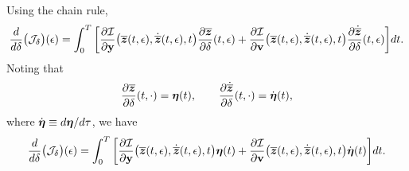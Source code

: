 \documentclass[3p,computermodern,10pt]{elsarticle}
\begin{document}
\begin{appendices}
Using the chain rule,
$$ 
\frac{d}{d\delta} \big( \mathcal{J}_{\delta} \big)(\epsilon)= 
\int_0^T \bigg[ \frac{\partial \mathcal{I}  }{\partial \mathbf{y} } \big(\overline{\boldsymbol z}(t,\epsilon),\dot{\overline{\boldsymbol z}}(t,\epsilon) ,t\big) \frac{\partial \overline{\boldsymbol z} }{\partial \delta}(t,\epsilon)  + \frac{\partial \mathcal{I}}{\partial \mathbf{{v}} } \big(\overline{\boldsymbol z}(t,\epsilon),\dot{\overline{\boldsymbol z}}(t,\epsilon) ,t \big) \frac{\partial \dot{\overline{\boldsymbol z}}}{\partial \delta} (t,\epsilon)\bigg]dt . $$
Noting that
$$\frac{\partial \overline{\boldsymbol z}}{\partial \delta} (t,\cdot)= \boldsymbol \eta(t), \qquad \frac{\partial \dot{\overline{\boldsymbol z}} }{\partial \delta}(t,\cdot)= \dot{\boldsymbol \eta}(t),$$
where $\dot{\boldsymbol \eta} \equiv d \boldsymbol \eta / d\tau$, 
we have
$$
\frac{d}{d\delta} \big( \mathcal{J}_{\delta} \big)(\epsilon)
= \int_0^T \bigg[ \frac{\partial \mathcal{I}  }{\partial \mathbf{y} } \big(\overline{\boldsymbol z}(t,\epsilon),\dot{\overline{\boldsymbol z}}(t,\epsilon),t \big) \boldsymbol \eta(t)  + \frac{\partial \mathcal{I}}{\partial \mathbf{{v}} } \big(\overline{\boldsymbol z}(t,\epsilon),\dot{\overline{\boldsymbol z}}(t,\epsilon) ,t \big) \dot{\boldsymbol \eta}(t) \bigg]dt. $$

\end{appendices}
\end{document}
